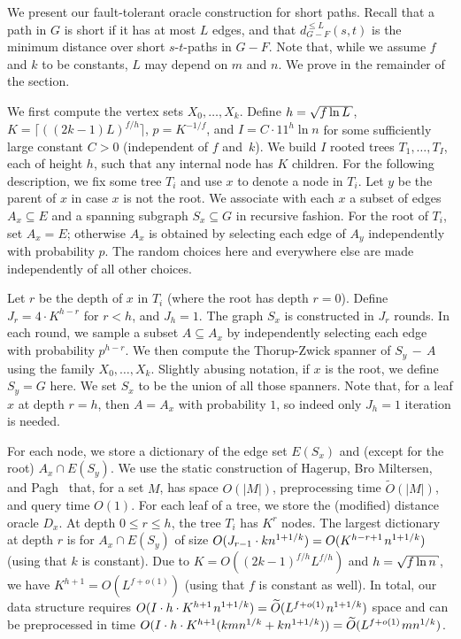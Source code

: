 \documentclass{article}\usepackage[a4paper,margin=20mm]{geometry}
\newcommand*{\Otilde}{\widetilde{O}}
\newcommand*{\nwspace}{\hspace*{.1em}}
\renewcommand{\le}{\leqslant}
\let\oldsqrt\sqrt
\def\hksqrt{\mathpalette\DHLhksqrt}
\def\DHLhksqrt#1#2{\setbox0=\hbox{$#1\oldsqrt{#2\,}$}\dimen0=\ht0
   \advance\dimen0-0.2\ht0
   \setbox2=\hbox{\vrule height\ht0 depth -\dimen0}%
   {\box0\lower0.4pt\box2}}
\renewcommand\sqrt\hksqrt
\begin{document}
We present our fault-tolerant oracle construction for short paths.
Recall that a path in $G$ is short if it has at most $L$ edges,
and that $d_{G-F}^{\le L}(s,t)$ is the minimum distance over short $s$-$t$-paths in $G-F$.
Note that, while we assume $f$ and $k$ to be constants, $L$ may depend on $m$ and $n$.
We prove  in the remainder of the section.
   
We first compute the vertex sets $X_0, \dots,X_k$.
Define {$h=\sqrt{f\ln L}$}, {$K = \big\lceil((2k{-}1)L)^{{f}/{h}}\big\rceil $, $p = K^{-1/f}$, and $I = C \cdot 11^{h} \ln n$} 
for some sufficiently large constant $C > 0$ (independent of $f$ and~$k$).
We build $I$ rooted trees $T_1, \dots, T_I$, each of height $h$,
such that any internal node has {$K$} children.
For the following description, we fix some tree $T_i$ and use $x$ to denote a node in $T_i$.
Let $y$ be the parent of $x$ in case $x$ is not the root.
We associate with each $x$ a subset of edges $A_x \subseteq E$ 
and a spanning subgraph $S_x \subseteq G$ in recursive fashion.
For the root of $T_i$, set $A_x = E$;
otherwise $A_x$ is obtained by selecting each edge of $A_y$ independently with probability $p$.
The random choices here and everywhere else
are made independently of all other choices.

Let $r$ be the depth of $x$ in $T_i$ (where the root has depth $r = 0$).
Define $J_r = 4 \cdot K^{h-r}$ for $r < h$, and $J_h = 1$.
The graph $S_x$ is constructed in $J_r$ rounds.
In each round, we sample a subset $A \subseteq A_x$ 
by independently selecting each edge with probability $p^{h-r}$.
We then compute the Thorup-Zwick spanner of $S_y\,{-}\,A$
using the family $X_0,\dots,X_k$.
Slightly abusing notation, if $x$ is the root, we define $S_y = G$ here.
We set $S_x$ to be the union of all those spanners.
Note that, for a leaf $x$ at depth $r = h$, then $A = A_x$ with probability $1$,
so indeed only $J_h = 1$ iteration is needed.

For each node, we store a dictionary of the edge set $E(S_x)$ 
and (except for the root) $A_x \cap E(S_y)$.
We use the static construction of Hagerup, Bro Miltersen, and Pagh~\cite{HagerupMiltersenPagh01DeterministicDictionaries}
that, for a set $M$, has space $O(|M|)$, preprocessing time $\Otilde(|M|)$,
and query time $O(1)$.
For each leaf of a tree, we store the (modified) distance oracle $D_x$.
At depth $0 \le r \le h$, 
the tree $T_i$ has $K^r$ nodes.
The largest dictionary at depth $r$ is for $A_x \cap E(S_y)$
of size $O(J_{r-1} \cdot kn^{1+1/k}) = O(K^{h-r+1} \nwspace n^{1+1/k})$
(using that $k$ is constant).
Due to $K = O((2k{-}1)^{f/h} L^{f/h})$ and $h = \sqrt{f \ln n}$,
we have $K^{h+1} = O(L^{f+o(1)})$ (using that $f$ is constant as well).
In total, our data structure requires 
$O(I \cdot h\cdot K^{h+1} \nwspace n^{1+1/k}) = \Otilde(L^{f+o(1)} \nwspace n^{1+1/k})$ space
and can be preprocessed in time 
$O(I \cdot h\cdot K^{h+1} (kmn^{1/k} + kn^{1+1/k})) = \Otilde(L^{f+o(1)} \nwspace mn^{1/k})$.
\end{document}
